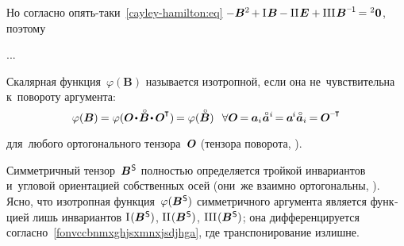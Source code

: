 \begin{otherlanguage}{russian}

Но согласно опять\hbox{-}таки~\eqref{cayley-hamilton:eq}
${\hspace{-0.1ex} -\bm{B}^{2} \hspace{-0.2ex} + \mathrm{I}\hspace{0.16ex} \bm{B} \hspace{-0.1ex} - \mathrm{II}\hspace{0.16ex} \bm{E} + \mathrm{III}\hspace{0.16ex} \bm{B}^{\expminusone} \hspace{-0.25ex} = {^2\bm{0}}}$, поэтому


...


Скалярная функция~${\varphi(\bm{B})}$ называется изотропной, если она не~чувствительна к~повороту аргумента:
\nopagebreak\vspace{.1em}\begin{equation*}
\varphi(\bm{B}) \hspace{-0.12ex} = \varphi ( \rotationtensor \narrowdotp \smash{\mathcircabove{\bm{B}}} \narrowdotp \hspace{.15ex} \rotationtensor^{\hspace{-0.1ex}\T} ) \hspace{-0.2ex} = \varphi(\smash{\mathcircabove{\bm{B}}}) \;\;\,
\forall \rotationtensor \hspace{-0.2ex} = \hspace{-0.1ex} \bm{a}_i \hspace{.1ex} \mathcircabove{\bm{a}}^i \hspace{-0.25ex} = \hspace{-0.1ex} \bm{a}^{\hspace{-0.2ex}i} \mathcircabove{\bm{a}}_i \hspace{-0.16ex} = \hspace{-0.1ex} \rotationtensor^{\hspace{-0.1ex}\expminusT}
\end{equation*}
\par\vspace{-0.25em}\noindent для~любого ортогонального тензора~$\bm{O}$ (тензора поворота, ).

Симметричный тензор~${\bm{B}^{\mathsf{\hspace{0.1ex}S}}}$ полностью определяется тройкой инвариантов и~угловой ориентацией собственных осей (они~же взаимно ортогональны, ). Ясно, что изотропная функция~${\varphi(\bm{B}^{\mathsf{\hspace{0.1ex}S}})}$ симметричного аргумента является функцией лишь инвариантов ${\mathrm{I}\hspace{0.16ex}({\bm{B}^{\mathsf{\hspace{0.1ex}S}}})}$, ${\mathrm{II}\hspace{0.16ex}({\bm{B}^{\mathsf{\hspace{0.1ex}S}}})}$, ${\mathrm{III}\hspace{0.16ex}({\bm{B}^{\mathsf{\hspace{0.1ex}S}}})}$; она дифференцируется согласно~\eqref{fonvccbnmxghjsxmnxjsdjhga}, где транспонирование излишне.


\end{otherlanguage}
